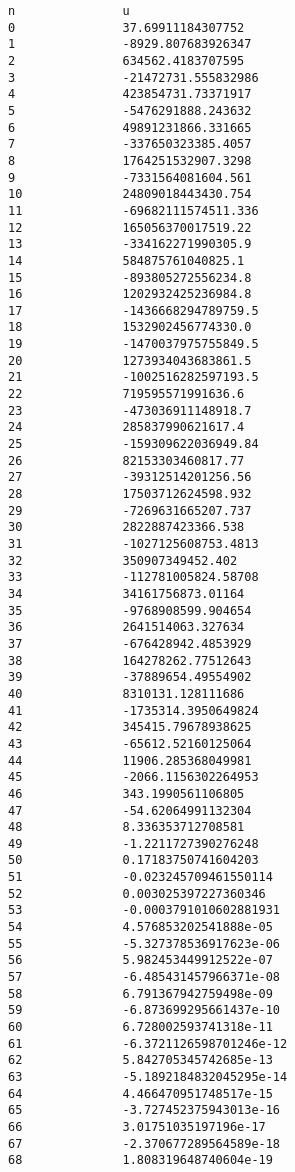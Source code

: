 \documentclass[11pt]{article}
\begin{document}
    \begin{Verbatim}[commandchars=\\\{\}]
n               u
0               37.69911184307752
1               -8929.807683926347
2               634562.4183707595
3               -21472731.555832986
4               423854731.73371917
5               -5476291888.243632
6               49891231866.331665
7               -337650323385.4057
8               1764251532907.3298
9               -7331564081604.561
10              24809018443430.754
11              -69682111574511.336
12              165056370017519.22
13              -334162271990305.9
14              584875761040825.1
15              -893805272556234.8
16              1202932425236984.8
17              -1436668294789759.5
18              1532902456774330.0
19              -1470037975755849.5
20              1273934043683861.5
21              -1002516282597193.5
22              719595571991636.6
23              -473036911148918.7
24              285837990621617.4
25              -159309622036949.84
26              82153303460817.77
27              -39312514201256.56
28              17503712624598.932
29              -7269631665207.737
30              2822887423366.538
31              -1027125608753.4813
32              350907349452.402
33              -112781005824.58708
34              34161756873.01164
35              -9768908599.904654
36              2641514063.327634
37              -676428942.4853929
38              164278262.77512643
39              -37889654.49554902
40              8310131.128111686
41              -1735314.3950649824
42              345415.79678938625
43              -65612.52160125064
44              11906.285368049981
45              -2066.1156302264953
46              343.1990561106805
47              -54.62064991132304
48              8.336353712708581
49              -1.2211727390276248
50              0.17183750741604203
51              -0.023245709461550114
52              0.003025397227360346
53              -0.0003791010602881931
54              4.576853202541888e-05
55              -5.327378536917623e-06
56              5.982453449912522e-07
57              -6.485431457966371e-08
58              6.791367942759498e-09
59              -6.873699295661437e-10
60              6.728002593741318e-11
61              -6.3721126598701246e-12
62              5.842705345742685e-13
63              -5.1892184832045295e-14
64              4.466470951748517e-15
65              -3.727452375943013e-16
66              3.01751035197196e-17
67              -2.370677289564589e-18
68              1.808319648740604e-19


\end{Verbatim}
\end{document}
